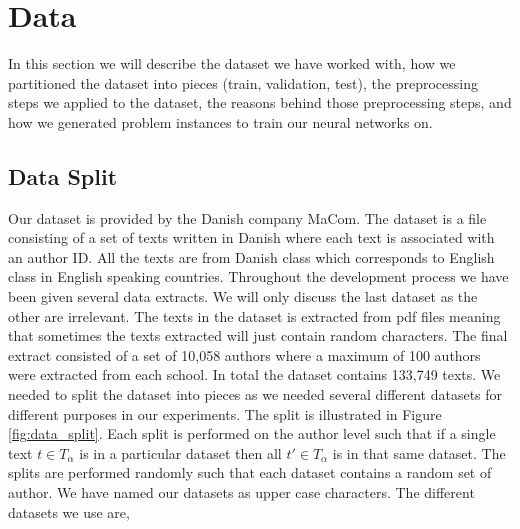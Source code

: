 \section{Data} \label{sec:data} 
In this section we will describe the dataset we have worked with, how we
partitioned the dataset into pieces (train, validation, test), the preprocessing
steps we applied to the dataset, the reasons behind those preprocessing steps,
and how we generated problem instances to train our neural networks on.


\subsection{Data Split}

Our dataset is provided by the Danish company MaCom. The dataset is a file
consisting of a set of texts written in Danish where each text is associated
with an author ID. All the texts are from Danish class which corresponds to
English class in English speaking countries. Throughout the development process
we have been given several data extracts. We will only discuss the last dataset
as the other are irrelevant. The texts in the dataset is extracted from pdf
files meaning that sometimes the texts extracted will just contain random
characters. The final extract consisted of a set of 10,058 authors where a
maximum of 100 authors were extracted from each school. In total the dataset
contains 133,749 texts. We needed to split the dataset into pieces as we needed
several different datasets for different purposes in our experiments. The split
is illustrated in Figure \ref{fig:data_split}. Each split is performed on the
author level such that if a single text $t \in T_\alpha$ is in a particular
dataset then all $t' \in T_\alpha$ is in that same dataset. The splits are
performed randomly such that each dataset contains a random set of author. We
have named our datasets as upper case characters. The different datasets we use
are,

